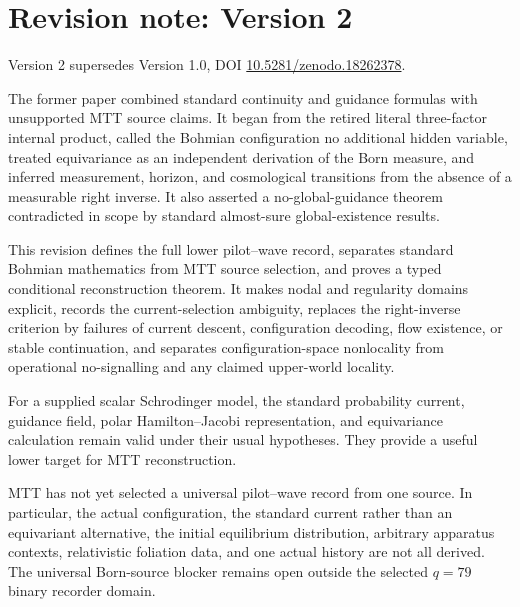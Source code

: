 \documentclass[11pt]{article}
\theoremstyle{definition}
\theoremstyle{remark}
\let\MTToriginalitem\item
\renewcommand{\item}{\par\MTToriginalitem}
\begin{document}
\section*{Revision note: Version 2}
\begin{description}[leftmargin=2.5cm,style=nextline]
\item[Supersedes]
Version 2 supersedes Version 1.0, DOI
\href{https://doi.org/10.5281/zenodo.18262378}
{10.5281/zenodo.18262378}.

\item[Reason]
The former paper combined standard continuity and guidance formulas with
unsupported MTT source claims.  It began from the retired literal
three-factor internal product, called the Bohmian configuration no
additional hidden variable, treated equivariance as an independent
derivation of the Born measure, and inferred measurement, horizon, and
cosmological transitions from the absence of a measurable right inverse.
It also asserted a no-global-guidance theorem contradicted in scope by
standard almost-sure global-existence results.

\item[Resolution]
This revision defines the full lower pilot--wave record, separates standard
Bohmian mathematics from MTT source selection, and proves a typed
conditional reconstruction theorem.  It makes nodal and regularity domains
explicit, records the current-selection ambiguity, replaces the
right-inverse criterion by failures of current descent, configuration
decoding, flow existence, or stable continuation, and separates
configuration-space nonlocality from operational no-signalling and any
claimed upper-world locality.

\item[Retained content]
For a supplied scalar Schrodinger model, the standard probability current,
guidance field, polar Hamilton--Jacobi representation, and equivariance
calculation remain valid under their usual hypotheses.  They provide a
useful lower target for MTT reconstruction.

\item[Remaining boundary]
MTT has not yet selected a universal pilot--wave record from one source.
In particular, the actual configuration, the standard current rather than
an equivariant alternative, the initial equilibrium distribution, arbitrary
apparatus contexts, relativistic foliation data, and one actual history are
not all derived.  The universal Born-source blocker remains open outside the
selected \(q=79\) binary recorder domain.
\end{description}
\end{document}
